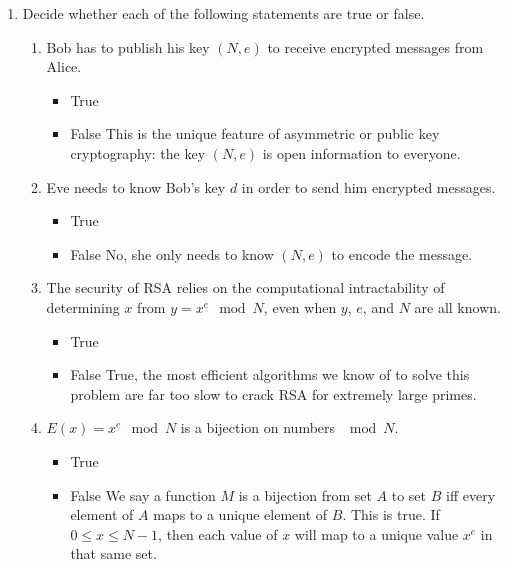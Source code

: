 \documentclass[11pt, preview]{standalone} %
\begin{document}
\begin{enumerate}
\begin{enumerate}
\begin{Freeform}{30}
Here we applied Fermat's Little Theorem and the fact that $ed \equiv 1 \bmod (p - 1)(q - 1)$ to verify the answer.

\end{Freeform}
\end{enumerate}


\item Decide whether each of the following statements are true or false.
\begin{enumerate}
\item Bob has to publish his key $(N,e)$ to receive encrypted messages from Alice. 
\begin{Choices}
\begin{itemize}
\TrueChoice\item True 
\FalseChoice\item False
\Solution This is the unique feature of asymmetric or public key cryptography: the key $(N, e)$ is open information to everyone.
\end{itemize}
\end{Choices}
\item Eve needs to know Bob's key $d$ in order to send him encrypted messages.
\begin{Choices} 
\begin{itemize}
\FalseChoice\item True
\TrueChoice\item False
\Solution No, she only needs to know $(N, e)$ to encode the message.
\end{itemize}
\end{Choices}
\item The security of RSA relies on the computational intractability of determining $x$ from $y = x^e \mod N$, even when $y$, $e$, and $N$ are all known.
\begin{Choices} 
\begin{itemize}
\TrueChoice\item True
\FalseChoice\item False
\Solution True, the most efficient algorithms we know of to solve this problem are far too slow to crack RSA for extremely large primes.
\end{itemize}
\end{Choices}
\item $E(x) = x^e \mod N$ is a bijection on numbers $\mod N$.
\begin{Choices} 
\begin{itemize}
\TrueChoice\item True
\FalseChoice\item False
\Hint We say a function $M$ is a bijection from set $A$ to set $B$ iff every element of $A$ maps to a unique element of $B$. 
\Solution This is true. If $0 \leq x \leq N - 1$, then each value of $x$ will map to a unique value $x^e$ in that same set. 


\end{itemize}
\end{Choices}
\end{enumerate}
\end{enumerate}
\end{document}

